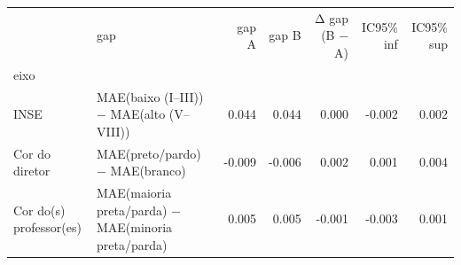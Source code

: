 \begin{tabular}{llrrrrr}
\toprule
 & gap & gap A & gap B & Δ gap (B − A) & IC95\% inf & IC95\% sup \\
eixo &  &  &  &  &  &  \\
\midrule
INSE & MAE(baixo (I–III)) − MAE(alto (V–VIII)) & 0.044 & 0.044 & 0.000 & -0.002 & 0.002 \\
Cor do diretor & MAE(preto/pardo) − MAE(branco) & -0.009 & -0.006 & 0.002 & 0.001 & 0.004 \\
Cor do(s) professor(es) & MAE(maioria preta/parda) − MAE(minoria preta/parda) & 0.005 & 0.005 & -0.001 & -0.003 & 0.001 \\
\bottomrule
\end{tabular}
